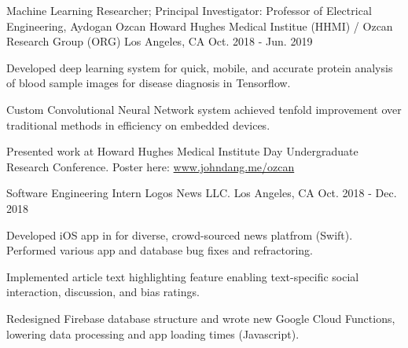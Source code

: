 \begin{cventries}
  \cventry
    {Machine Learning Researcher; Principal Investigator: Professor of Electrical Engineering, Aydogan Ozcan} %
    {Howard Hughes Medical Institue (HHMI) / Ozcan Research Group (ORG)} %
    {Los Angeles, CA} %
    {Oct. 2018 - Jun. 2019} %
    {
      \begin{cvitems} %
        \item {Developed deep learning system for quick, mobile, and accurate protein analysis of blood sample images for disease diagnosis in Tensorflow.}
        \item {Custom Convolutional Neural Network system achieved tenfold improvement over traditional methods in efficiency on embedded devices.}
        \item Presented work at Howard Hughes Medical Institute Day Undergraduate Research Conference. Poster here: \href{https://www.johndang.me/ozcan}{www.johndang.me/ozcan}
      \end{cvitems}
    }

  \cventry
    {Software Engineering Intern} %
    {Logos News LLC.} %
    {Los Angeles, CA} %
    {Oct. 2018 - Dec. 2018} %
    {
      \begin{cvitems} %
        \item {Developed iOS app in for diverse, crowd-sourced news platfrom (Swift). Performed various app and database bug fixes and refractoring.
        \item Implemented article text highlighting feature enabling text-specific social interaction, discussion, and bias ratings.}
        \item Redesigned Firebase database structure and wrote new Google Cloud Functions, lowering data processing and app loading times (Javascript).
      \end{cvitems}
    }

\end{cventries}
